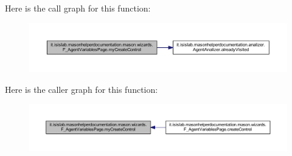 Here is the call graph for this function\-:
\nopagebreak
\begin{figure}[H]
\begin{center}
\leavevmode
\includegraphics[width=350pt]{classit_1_1isislab_1_1masonhelperdocumentation_1_1mason_1_1wizards_1_1_f___agent_variables_page_a182a280459538ed143e8cd15904dd7c3_cgraph}
\end{center}
\end{figure}




Here is the caller graph for this function\-:
\nopagebreak
\begin{figure}[H]
\begin{center}
\leavevmode
\includegraphics[width=350pt]{classit_1_1isislab_1_1masonhelperdocumentation_1_1mason_1_1wizards_1_1_f___agent_variables_page_a182a280459538ed143e8cd15904dd7c3_icgraph}
\end{center}
\end{figure}




